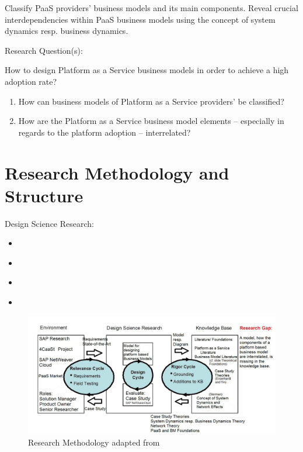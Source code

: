 Classify PaaS providers' business models and its main components. Reveal crucial interdependencies within PaaS business models using the concept of system dynamics resp. business dynamics.

\noindent Research Question(s):

\noindent How to design Platform as a Service business models in order to achieve a high adoption rate?
\begin{enumerate}
	\item How can business models of Platform as a Service providers' be classified?
	\item How are the Platform as a Service business model elements -- especially in regards to the platform adoption -- interrelated?
\end{enumerate}

\section{Research Methodology and Structure}

Design Science Research:
\begin{itemize}
	\item \citet{March1995}
	\item \citet{Hevner2004}
	\item \citet{Hevner2007}
	\item \citet{Peffers2007}
\end{itemize}

\begin{figure}[htb]
	\centering
	\includegraphics[width=\textwidth]{gfx/researchMethodology}
	\caption[Research Methodology]{Research Methodology adapted from \citet{Hevner2007}}
	\label{fig:rm}
\end{figure}